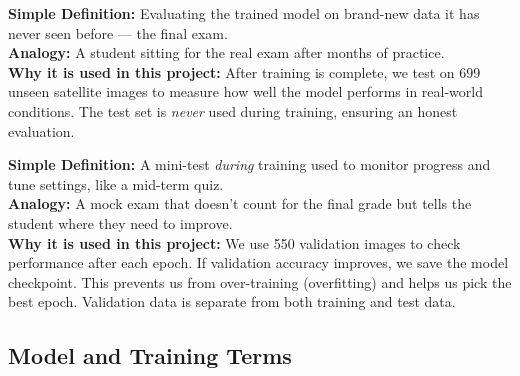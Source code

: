 \documentclass[11pt]{article}
\begin{document}
\begin{description}[style=nextline, leftmargin=1.5cm]
    \item[\textbf{Testing}]
    \textbf{Simple Definition:} Evaluating the trained model on brand-new data it has never seen before --- the final exam.\\
    \textbf{Analogy:} A student sitting for the real exam after months of practice.\\
    \textbf{Why it is used in this project:} After training is complete, we test on 699 unseen satellite images to measure how well the model performs in real-world conditions. The test set is \emph{never} used during training, ensuring an honest evaluation.

    \item[\textbf{Validation}]
    \textbf{Simple Definition:} A mini-test \emph{during} training used to monitor progress and tune settings, like a mid-term quiz.\\
    \textbf{Analogy:} A mock exam that doesn't count for the final grade but tells the student where they need to improve.\\
    \textbf{Why it is used in this project:} We use 550 validation images to check performance after each epoch. If validation accuracy improves, we save the model checkpoint. This prevents us from over-training (overfitting) and helps us pick the best epoch. Validation data is separate from both training and test data.

\end{description}

\subsection{Model and Training Terms}
\end{document}
